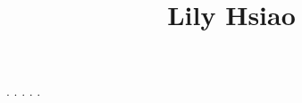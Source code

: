 \documentclass[11pt, oneside]{article}
\title{Lily Hsiao}
\begin{document}
\maketitle
\cite{wright2009robust}.
\cite{kemelmacher20113d}.
\cite{rivera2013local}.
\cite{ren2014face}.
\cite{zhu2016unconstrained}.



\end{document}
